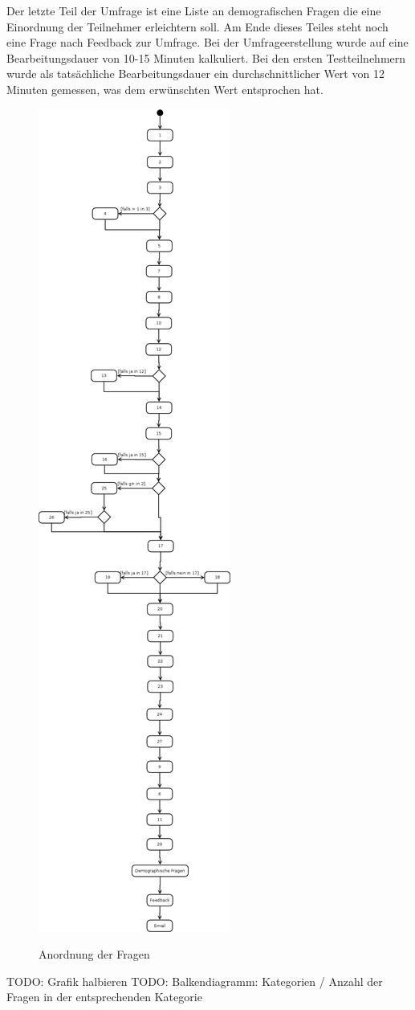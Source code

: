 Der letzte Teil der Umfrage ist eine Liste an demografischen Fragen die eine Einordnung der Teilnehmer erleichtern soll. Am Ende dieses Teiles steht noch eine Frage nach Feedback zur Umfrage.
Bei der Umfrageerstellung wurde auf eine Bearbeitungsdauer von 10-15 Minuten kalkuliert. Bei den ersten Testteilnehmern wurde als tatsächliche Bearbeitungsdauer ein durchschnittlicher Wert von 12 Minuten gemessen, was dem erwünschten Wert entsprochen hat.
\begin{figure}[H]
\centering
\includegraphics[height=\textheight]{images/umldia}\\
\caption{Anordnung der Fragen}\label{umldia}
\end{figure}
TODO: Grafik halbieren
TODO: Balkendiagramm: Kategorien / Anzahl der Fragen in der entsprechenden Kategorie

